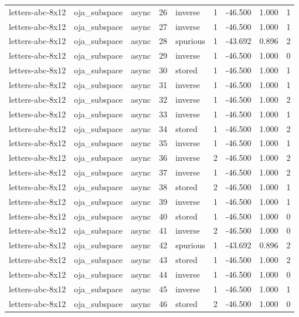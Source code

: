 \begin{tabular}{lllrlrrrr}
letters-abc-8x12 & oja\_subspace & async & 26 & inverse & 1 & -46.500 & 1.000 & 1 \\
letters-abc-8x12 & oja\_subspace & async & 27 & inverse & 1 & -46.500 & 1.000 & 1 \\
letters-abc-8x12 & oja\_subspace & async & 28 & spurious & 1 & -43.692 & 0.896 & 2 \\
letters-abc-8x12 & oja\_subspace & async & 29 & inverse & 1 & -46.500 & 1.000 & 0 \\
letters-abc-8x12 & oja\_subspace & async & 30 & stored & 1 & -46.500 & 1.000 & 1 \\
letters-abc-8x12 & oja\_subspace & async & 31 & inverse & 1 & -46.500 & 1.000 & 1 \\
letters-abc-8x12 & oja\_subspace & async & 32 & inverse & 1 & -46.500 & 1.000 & 2 \\
letters-abc-8x12 & oja\_subspace & async & 33 & inverse & 1 & -46.500 & 1.000 & 1 \\
letters-abc-8x12 & oja\_subspace & async & 34 & stored & 1 & -46.500 & 1.000 & 2 \\
letters-abc-8x12 & oja\_subspace & async & 35 & inverse & 1 & -46.500 & 1.000 & 1 \\
letters-abc-8x12 & oja\_subspace & async & 36 & inverse & 2 & -46.500 & 1.000 & 2 \\
letters-abc-8x12 & oja\_subspace & async & 37 & inverse & 1 & -46.500 & 1.000 & 2 \\
letters-abc-8x12 & oja\_subspace & async & 38 & stored & 2 & -46.500 & 1.000 & 1 \\
letters-abc-8x12 & oja\_subspace & async & 39 & inverse & 1 & -46.500 & 1.000 & 1 \\
letters-abc-8x12 & oja\_subspace & async & 40 & stored & 1 & -46.500 & 1.000 & 0 \\
letters-abc-8x12 & oja\_subspace & async & 41 & inverse & 2 & -46.500 & 1.000 & 0 \\
letters-abc-8x12 & oja\_subspace & async & 42 & spurious & 1 & -43.692 & 0.896 & 2 \\
letters-abc-8x12 & oja\_subspace & async & 43 & stored & 1 & -46.500 & 1.000 & 2 \\
letters-abc-8x12 & oja\_subspace & async & 44 & inverse & 1 & -46.500 & 1.000 & 0 \\
letters-abc-8x12 & oja\_subspace & async & 45 & inverse & 1 & -46.500 & 1.000 & 1 \\
letters-abc-8x12 & oja\_subspace & async & 46 & stored & 2 & -46.500 & 1.000 & 0 \\

\end{tabular}
